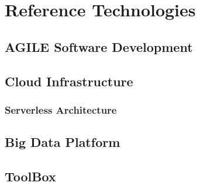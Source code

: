 \chapter{Reference Technologies}
\section{AGILE Software Development}
\section{Cloud Infrastructure}
\subsection{Serverless Architecture}
\section{Big Data Platform}
\section{ToolBox}
